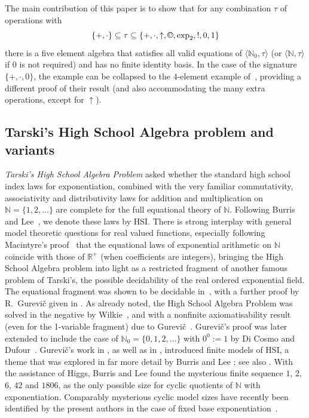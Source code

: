 \documentclass[eqnor,reqno]{amsart}
\theoremstyle{plain}
\theoremstyle{definition}
\newcommand{\cc}{\mathbin{\textup{\copyright}}}
\newcommand{\HSI}{\textsf{HSI}}
\begin{document}
The main contribution of this paper is to show that for any combination $\tau$ of operations with 
\[
\{+,\cdot\}\subseteq \tau\subseteq \{+,\cdot,\uparrow,\cc,\exp_2,!,0,1\}
\] 
there is a five element algebra that satisfies all valid equations of $\langle\mathbb{N}_0,\tau\rangle$ (or $\langle\mathbb{N},\tau\rangle$ if $0$ is not required) and has no finite identity basis.  
In the case of the signature $\{+,\cdot,0\}$, the example can be collapsed to the $4$-element example of~\cite{WRZ}, providing a different proof of their result (and also accommodating the many extra operations, except for $\uparrow$). 


\subsection{Tarski's High School Algebra problem and variants}
\emph{Tarski's High School Algebra Problem} asked whether the standard high school index laws for exponentiation, combined with the very familiar commutativity, associativity and distributivity laws for addition and multiplication on $\mathbb{N}=\{1,2,\dots\}$ are complete for the full equational theory of $\mathbb{N}$.  Following Burris and Lee~\cite{burlee92}, we denote these laws by \HSI.
There is strong interplay with general model theoretic questions for real valued functions, especially following Macintyre's proof~\cite{mac} that the equational laws of exponential arithmetic on $\mathbb{N}$ coincide with those of $\mathbb{R}^+$ (when coefficients are integers), bringing the High School Algebra problem into light as a restricted fragment of another famous problem of Tarski's, the possible decidability of the real ordered exponential field.  
The equational fragment was shown to be decidable in~\cite{mac}, with a further proof by R.~Gurevi\v{c} given in \cite{gur85}.
As already noted, the High School Algebra Problem was solved in the negative by Wilkie~\cite{wil03}, and with a nonfinite axiomatisability result (even for the 1-variable fragment) due to Gurevi\v{c}~\cite{gur90}.  
Gurevi\v{c}'s proof was later extended to include the case of $\mathbb{N}_0=\{0,1,2,\dots\}$ with $0^0:=1$ by Di Cosmo and Dufour~\cite{DiCosDuf}.   
Gurevi\v{c}'s work in \cite{gur90}, as well as in \cite{gur85}, introduced finite models of \HSI, a theme that was explored in far more detail by Burris and Lee \cite{burlee92}; see also \cite{burlee93}.  
With the assistance of Higgs, Burris and Lee found the mysterious finite sequence  $1$, $2$, $6$, $42$ and $1806$, as the only possible size for cyclic quotients of $\mathbb{N}$ with exponentiation.  Comparably mysterious cyclic model sizes have recently been identified by the present authors in the case of fixed base exponentiation~\cite{alsjac}.
\end{document}
